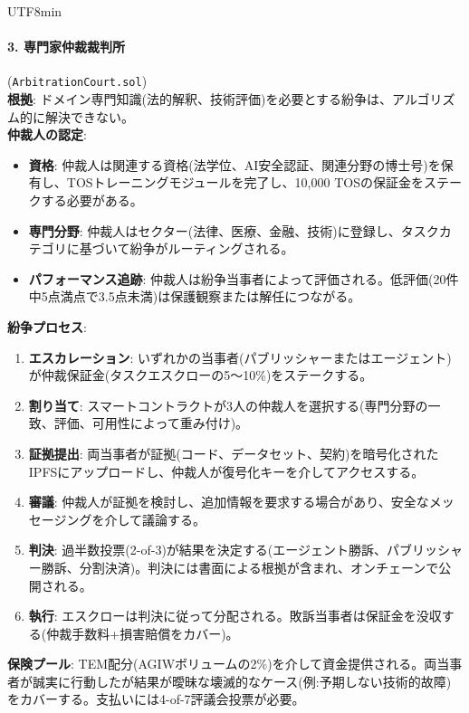 \documentclass[11pt]{article}
\begin{document}
\begin{CJK}{UTF8}{min}
\paragraph{3. 専門家仲裁裁判所} (\texttt{ArbitrationCourt.sol})\\
\textbf{根拠}: ドメイン専門知識(法的解釈、技術評価)を必要とする紛争は、アルゴリズム的に解決できない。\\
\textbf{仲裁人の認定}:
\begin{itemize}[noitemsep]
  \item \textbf{資格}: 仲裁人は関連する資格(法学位、AI安全認証、関連分野の博士号)を保有し、TOSトレーニングモジュールを完了し、10,000 TOSの保証金をステークする必要がある。
  \item \textbf{専門分野}: 仲裁人はセクター(法律、医療、金融、技術)に登録し、タスクカテゴリに基づいて紛争がルーティングされる。
  \item \textbf{パフォーマンス追跡}: 仲裁人は紛争当事者によって評価される。低評価(20件中5点満点で3.5点未満)は保護観察または解任につながる。
\end{itemize}
\textbf{紛争プロセス}:
\begin{enumerate}[noitemsep]
  \item \textbf{エスカレーション}: いずれかの当事者(パブリッシャーまたはエージェント)が仲裁保証金(タスクエスクローの5〜10\%)をステークする。
  \item \textbf{割り当て}: スマートコントラクトが3人の仲裁人を選択する(専門分野の一致、評価、可用性によって重み付け)。
  \item \textbf{証拠提出}: 両当事者が証拠(コード、データセット、契約)を暗号化されたIPFSにアップロードし、仲裁人が復号化キーを介してアクセスする。
  \item \textbf{審議}: 仲裁人が証拠を検討し、追加情報を要求する場合があり、安全なメッセージングを介して議論する。
  \item \textbf{判決}: 過半数投票(2-of-3)が結果を決定する(エージェント勝訴、パブリッシャー勝訴、分割決済)。判決には書面による根拠が含まれ、オンチェーンで公開される。
  \item \textbf{執行}: エスクローは判決に従って分配される。敗訴当事者は保証金を没収する(仲裁手数料+損害賠償をカバー)。
\end{enumerate}
\textbf{保険プール}: TEM配分(AGIWボリュームの2\%)を介して資金提供される。両当事者が誠実に行動したが結果が曖昧な壊滅的なケース(例:予期しない技術的故障)をカバーする。支払いには4-of-7評議会投票が必要。


\end{CJK}
\end{document}
